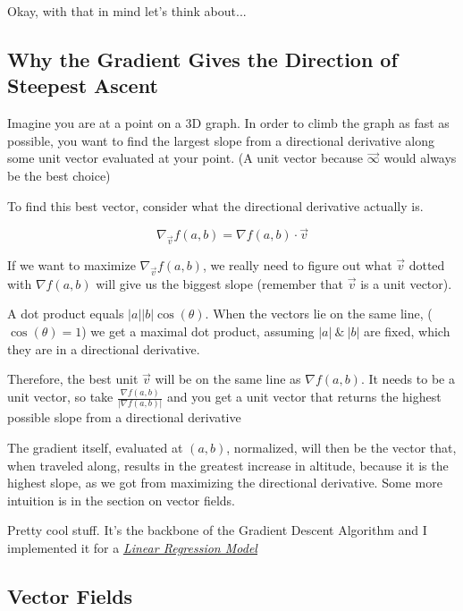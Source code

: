 \documentclass[12pt, letterpaper]{article}
\newcommand{\externalLink}[2]{\emph{\underline{\href{#1}{#2}}}}
\begin{document}
Okay, with that in mind let's think about...

\subsection{Why the Gradient Gives the Direction of Steepest Ascent}

Imagine you are at a point on a 3D graph. In order to climb the graph as fast as possible, you want to find the largest slope from a directional derivative along some unit vector evaluated at your point. (A unit vector because $\vec{\infty}$ would always be the best choice)

To find this best vector, consider what the directional derivative actually is.

\begin{displaymath}
    \nabla_{\vec{v}} f(a, b) = \nabla f(a, b) \cdot \vec{v}
\end{displaymath}

If we want to maximize $\nabla_{\vec{v}} f(a, b)$, we really need to figure out what $\vec{v}$ dotted with $\nabla f(a, b)$ will give us the biggest slope (remember that $\vec{v}$ is a unit vector).

A dot product equals $|a| |b| \cos(\theta)$. When the vectors lie on the same line, ($\cos(\theta) = 1$) we get a maximal dot product, assuming $|a|\ \&\ |b|$ are fixed, which they are in a directional derivative.

Therefore, the best unit $\vec{v}$ will be on the same line as $\nabla f(a, b)$. It needs to be a unit vector, so take $\frac{\nabla f(a, b)}{|\nabla f(a, b)|}$ and you get a unit vector that returns the highest possible slope from a directional derivative

The gradient itself, evaluated at $(a, b)$, normalized, will then be the vector that, when traveled along, results in the greatest increase in altitude, because it is the highest slope, as we got from maximizing the directional derivative. Some more intuition is in the section on vector fields.

Pretty cool stuff. It's the backbone of the Gradient Descent Algorithm and I implemented it for a \externalLink{https://github.com/SAXTEN2011/LinearRegression/blob/master/index.js}{Linear Regression Model}

\subsection{Vector Fields}
\end{document}

